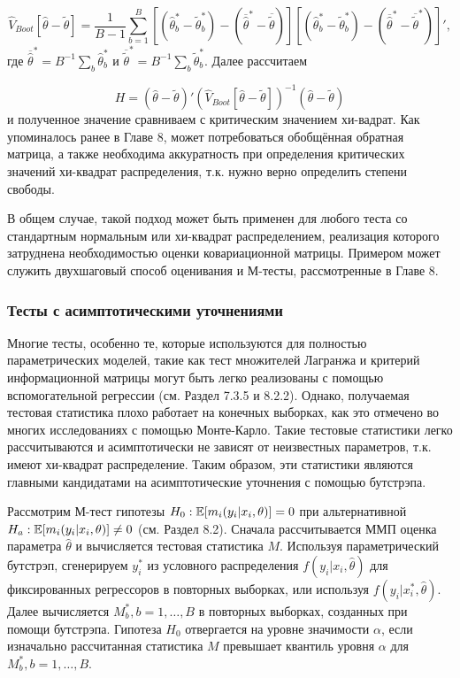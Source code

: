 \[
\hat{V}_{Boot}[\hat{\theta}-\tilde{\theta}]=\dfrac{1}{B-1}\sum^{B}_{b=1}[(\hat{\theta}^{*}_b-\tilde{\theta}^{*}_{b})-(\overline{\hat{\theta}}^*-\overline{\tilde{\theta}})][(\hat{\theta}^{*}_b-\tilde{\theta}^{*}_b)-(\overline{\hat{\theta}}^*-\overline{\tilde{\theta}}^*)]',
\]
где $\overline{\hat{\theta}}^*=B^{-1}\sum_{b}\hat{\theta}^{*}_b$ и $\overline{\tilde{\theta}}^*=B^{-1}\sum_{b}\tilde{\theta}^{*}_b$. Далее рассчитаем 

\begin{equation}
H=(\hat{\theta}-\tilde{\theta})'(\hat{V}_{Boot}[\hat{\theta}-\tilde{\theta}])^{-1}(\hat{\theta}-\tilde{\theta})
\end{equation}
и полученное значение сравниваем с критическим значением хи-вадрат. Как упоминалось ранее в Главе 8, может потребоваться обобщённая обратная матрица, а также необходима аккуратность при определения критических значений хи-квадрат распределения, т.к. нужно  верно определить степени свободы.


В общем случае, такой подход может быть применен для любого теста со стандартным нормальным или хи-квадрат распределением, реализация которого затруднена необходимостью оценки ковариационной матрицы. Примером может служить двухшаговый способ оценивания и М-тесты, рассмотренные в Главе 8. 

\subsubsection*{Тесты с асимптотическими уточнениями}

Многие тесты, особенно те, которые используются для полностью параметрических моделей, такие как тест множителей Лагранжа и критерий информационной матрицы могут быть легко реализованы с помощью  вспомогательной регрессии (см. Раздел 7.3.5 и 8.2.2). Однако, получаемая тестовая статистика плохо работает на конечных выборках, как это отмечено во многих исследованиях с помощью Монте-Карло. Такие тестовые статистики легко рассчитываются и асимптотически не зависят от неизвестных параметров, т.к. имеют хи-квадрат распределение. Таким образом, эти статистики являются главными кандидатами на асимптотические уточнения с помощью бутстрэпа.

Рассмотрим М-тест гипотезы $H_0:\mathbb{E}[m_i(y_i|x_i,\theta)]=0$ при альтернативной $H_a:\mathbb{E}[m_i(y_i|x_i,\theta)] \neq 0$ (см. Раздел 8.2). Сначала рассчитывается ММП  оценка параметра $\hat{\theta}$  и вычисляется тестовая статистика $M$. Используя параметрический бутстрэп, сгенерируем $y^*_i$ из условного распределения $f(y_i|x_i,\hat{\theta})$ для фиксированных регрессоров в повторных выборках, или используя $f(y_i|x_i^*,\hat{\theta})$. Далее вычисляется $M^*_b, b=1,\ldots, B$ в повторных выборках, созданных при помощи бутстрэпа. Гипотеза $H_0$ отвергается на уровне значимости $\alpha$, если изначально рассчитанная статистика $M$ превышает квантиль уровня $\alpha$ для $M^{*}_b, b=1,\ldots, B$.


